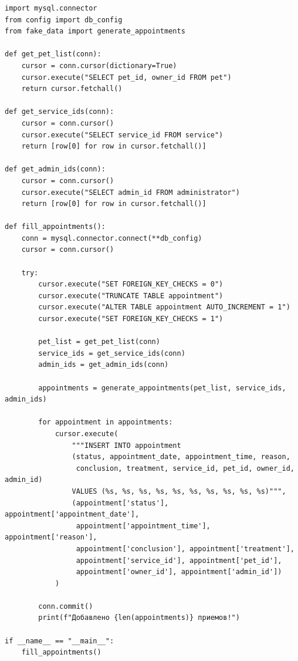 \documentclass[a4paper]{article}
\begin{document}
\begin{lstlisting}[caption = Заполнение таблицы Appointment, basicstyle= \scriptsize \ttfamily]
import mysql.connector
from config import db_config
from fake_data import generate_appointments

def get_pet_list(conn):
    cursor = conn.cursor(dictionary=True)
    cursor.execute("SELECT pet_id, owner_id FROM pet")
    return cursor.fetchall()

def get_service_ids(conn):
    cursor = conn.cursor()
    cursor.execute("SELECT service_id FROM service")
    return [row[0] for row in cursor.fetchall()]

def get_admin_ids(conn):
    cursor = conn.cursor()
    cursor.execute("SELECT admin_id FROM administrator")
    return [row[0] for row in cursor.fetchall()]

def fill_appointments():
    conn = mysql.connector.connect(**db_config)
    cursor = conn.cursor()
    
    try:
        cursor.execute("SET FOREIGN_KEY_CHECKS = 0")
        cursor.execute("TRUNCATE TABLE appointment")
        cursor.execute("ALTER TABLE appointment AUTO_INCREMENT = 1")
        cursor.execute("SET FOREIGN_KEY_CHECKS = 1")
        
        pet_list = get_pet_list(conn)
        service_ids = get_service_ids(conn)
        admin_ids = get_admin_ids(conn)

        appointments = generate_appointments(pet_list, service_ids, admin_ids)
        
        for appointment in appointments:
            cursor.execute(
                """INSERT INTO appointment 
                (status, appointment_date, appointment_time, reason, 
                 conclusion, treatment, service_id, pet_id, owner_id, admin_id)
                VALUES (%s, %s, %s, %s, %s, %s, %s, %s, %s, %s)""",
                (appointment['status'], appointment['appointment_date'],
                 appointment['appointment_time'], appointment['reason'],
                 appointment['conclusion'], appointment['treatment'],
                 appointment['service_id'], appointment['pet_id'],
                 appointment['owner_id'], appointment['admin_id'])
            )
        
        conn.commit()
        print(f"Добавлено {len(appointments)} приемов!")

if __name__ == "__main__":
    fill_appointments()
\end{lstlisting}
\end{document}

